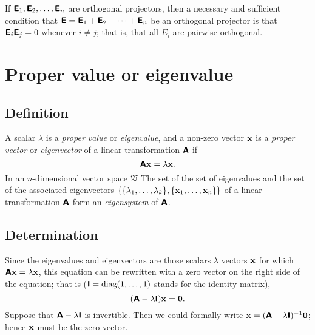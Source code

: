 If $\textsf{\textbf{E}}_1,\textsf{\textbf{E}}_2, \ldots , \textsf{\textbf{E}}_n$ are orthogonal
projectors,
then a necessary and sufficient condition that
$\textsf{\textbf{E}} =\textsf{\textbf{E}}_1+\textsf{\textbf{E}}_2+\cdots +\textsf{\textbf{E}}_n$
be an orthogonal projector is that  $\textsf{\textbf{E}}_i \textsf{\textbf{E}}_j =0$
whenever $i\neq j$; that is, that all $E_i$ are pairwise orthogonal.



\section{Proper value or eigenvalue}

\subsection{Definition}

A scalar $\lambda$ is a {\em proper value} or {\em eigenvalue},
and a non-zero vector ${\bf x}$ is a {\em proper vector} or {\em eigenvector}
of a linear transformation $\textsf{\textbf{A}}$
if
\begin{equation}
\textsf{\textbf{A}}{\bf x}=   \lambda {\bf x}.
\end{equation}
In an $n$-dimensional
vector space $\frak V$
The set of the set of eigenvalues and the set of the associated eigenvectors
$\{\{\lambda_1,\ldots ,\lambda_k\},\{{\bf x}_1,\ldots ,{\bf x}_n\}\}$
of a linear transformation $\textsf{\textbf{A}}$ form an {\em eigensystem} of $\textsf{\textbf{A}}$.

\subsection{Determination}



Since the eigenvalues and eigenvectors are those scalars $\lambda$  vectors ${\bf x}$ for which $\textsf{\textbf{A}}{\bf x}=   \lambda {\bf x}$,
this equation can be rewritten with a zero vector on the right side of the equation; that is ($\textsf{\textbf{I}}=\textrm{diag}(1,\ldots ,1)$ stands for the identity matrix),
\begin{equation}
(\textsf{\textbf{A}} - \lambda \textsf{\textbf{I}}){\bf x}= {\bf 0}.
\label{2011-m-eve}
\end{equation}
Suppose that $\textsf{\textbf{A}} - \lambda \textsf{\textbf{I}}$ is invertible. Then we could formally write
${\bf x} = (\textsf{\textbf{A}} - \lambda \textsf{\textbf{I}})^{-1}{\bf 0}$; hence ${\bf x}$ must be the zero vector.

